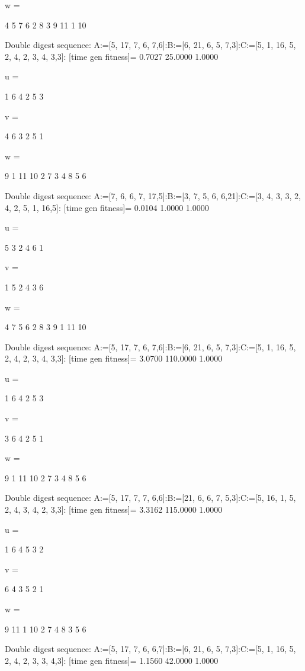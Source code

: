 w =

     4     5     7     6     2     8     3     9    11     1    10

Double digest sequence:
A:=[5, 17, 7, 6, 7,6]:B:=[6, 21, 6, 5, 7,3]:C:=[5, 1, 16, 5, 2, 4, 2, 3, 4, 3,3]:
[time gen fitness]=
    0.7027   25.0000    1.0000


u =

     1     6     4     2     5     3


v =

     4     6     3     2     5     1


w =

     9     1    11    10     2     7     3     4     8     5     6

Double digest sequence:
A:=[7, 6, 6, 7, 17,5]:B:=[3, 7, 5, 6, 6,21]:C:=[3, 4, 3, 3, 2, 4, 2, 5, 1, 16,5]:
[time gen fitness]=
    0.0104    1.0000    1.0000


u =

     5     3     2     4     6     1


v =

     1     5     2     4     3     6


w =

     4     7     5     6     2     8     3     9     1    11    10

Double digest sequence:
A:=[5, 17, 7, 6, 7,6]:B:=[6, 21, 6, 5, 7,3]:C:=[5, 1, 16, 5, 2, 4, 2, 3, 4, 3,3]:
[time gen fitness]=
    3.0700  110.0000    1.0000


u =

     1     6     4     2     5     3


v =

     3     6     4     2     5     1


w =

     9     1    11    10     2     7     3     4     8     5     6

Double digest sequence:
A:=[5, 17, 7, 7, 6,6]:B:=[21, 6, 6, 7, 5,3]:C:=[5, 16, 1, 5, 2, 4, 3, 4, 2, 3,3]:
[time gen fitness]=
    3.3162  115.0000    1.0000


u =

     1     6     4     5     3     2


v =

     6     4     3     5     2     1


w =

     9    11     1    10     2     7     4     8     3     5     6

Double digest sequence:
A:=[5, 17, 7, 6, 6,7]:B:=[6, 21, 6, 5, 7,3]:C:=[5, 1, 16, 5, 2, 4, 2, 3, 3, 4,3]:
[time gen fitness]=
    1.1560   42.0000    1.0000


